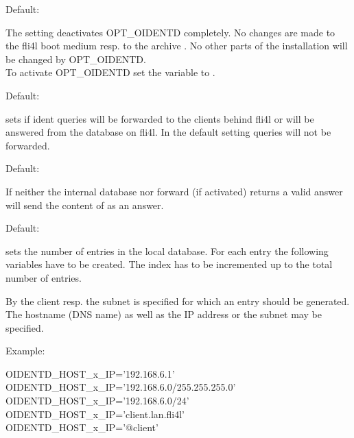 \begin{description}


  Default: 

  The setting  deactivates OPT\_OIDENTD completely. No changes
  are made to the fli4l boot medium resp. to the archive .
  No other parts of the installation will be changed by OPT\_OIDENTD.\\
  To activate OPT\_OIDENTD set the variable  to
  .



  Default: 

   sets if  ident queries
  will be forwarded to the clients behind fli4l or will be answered
  from the database on fli4l. In the default setting queries will not
  be forwarded.


  Default: 

  If neither the internal database nor forward (if activated)
  returns a valid answer  will send the content of
   as an answer.


  Default: 

   sets the number of entries in the local
  database. For each entry the following 
  variables have to be created. The index  has to be incremented
  up to the total number of entries.



  By  the client resp. the subnet is specified
  for which an entry should be generated. The hostname (DNS name) as well
  as the IP address or the subnet may be specified.

  Example:

  \begin{example}
  OIDENTD\_HOST\_x\_IP='192.168.6.1'\\
  OIDENTD\_HOST\_x\_IP='192.168.6.0/255.255.255.0'\\
  OIDENTD\_HOST\_x\_IP='192.168.6.0/24'\\
  OIDENTD\_HOST\_x\_IP='client.lan.fli4l'\\
  OIDENTD\_HOST\_x\_IP='@client'
  \end{example}



\end{description}
